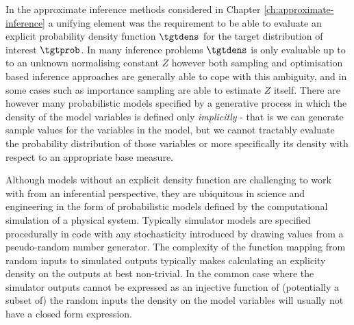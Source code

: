 In the approximate inference methods considered in Chapter \ref{ch:approximate-inference} a unifying element was the requirement to be able to evaluate an explicit probability density function $\tgtdens$ for the target distribution of interest $\tgtprob$. In many inference problems $\tgtdens$ is only evaluable up to to an unknown normalising constant $Z$ however both sampling and optimisation based inference approaches are generally able to cope with this ambiguity, and in some cases such as importance sampling are able to estimate $Z$ itself. There are however many probabilistic models specified by a generative process in which the density of the model variables is defined only \emph{implicitly} \citep{beaumont2002approximate,gourieroux1993indirect,diggle1984monte} - that is we can generate sample values for the variables in the model, but we cannot tractably evaluate the probability distribution of those variables or more specifically its density with respect to an appropriate base measure. 

Although models without an explicit density function are challenging to work with from an inferential perspective, they are ubiquitous in science and engineering in the form of probabilistic models defined by the computational simulation of a physical system. Typically simulator models are specified procedurally in code with any stochasticity introduced by drawing values from a pseudo-random number generator. %
The complexity of the function mapping from random inputs to simulated outputs typically makes calculating an explicity density on the outputs at best non-trivial. In the common case where the simulator outputs cannot be expressed as an injective function of (potentially a subset of) the random inputs the density on the model variables will usually not have a closed form expression.

